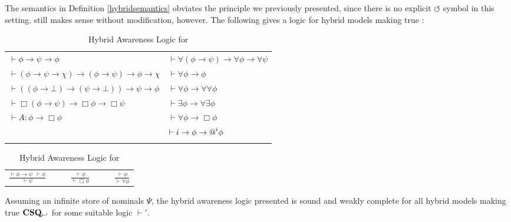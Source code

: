 The semantics in Definition \ref{hybridsemantics} obviates the 
principle we previously presented, since there is no explicit
$\circlearrowleft$ symbol in this setting.  still makes sense
without modification, however.  The following gives a logic for hybrid models
making true :
\begin{table}[h]
\begin{centering}
  \begin{tabular}{ll}
    $\vdash \phi \rightarrow \psi \rightarrow \phi$ & $\vdash \forall (\phi
    \rightarrow \psi) \rightarrow \forall \phi \rightarrow \forall \psi$\\
    $\vdash (\phi \rightarrow \psi \rightarrow \chi) \rightarrow (\phi
    \rightarrow \psi) \rightarrow \phi \rightarrow \chi$ & $\vdash \forall
    \phi \rightarrow \phi$\\
    $\vdash ((\phi \rightarrow \bot) \rightarrow (\psi \rightarrow \bot))
    \rightarrow \psi \rightarrow \phi$ & $\vdash \forall \phi \rightarrow
    \forall \forall \phi$\\
    $\vdash \Box(\phi \rightarrow \psi) \rightarrow \Box \phi \rightarrow \Box
    \psi$ & $\vdash \exists \phi \rightarrow \forall \exists \phi$\\
    $\vdash A : \phi \rightarrow \Box \phi$ & $\vdash \forall \phi \rightarrow
    \Box \phi$\\
    & $\vdash i \rightarrow \phi \rightarrow \text{{\upshape{@}}}^i \phi$\\
    &  
  \end{tabular}
\begin{tabular}{lllll}
      $\displaystyle\frac{\vdash \phi \rightarrow \psi \ \ \vdash \phi}{\vdash
      \psi}$ & \ \  & $\displaystyle \frac{\vdash \phi}{\vdash \Box \phi}$ &
      \ \  & $\displaystyle \frac{\vdash \phi}{\vdash \forall \phi}$
    \end{tabular}
  \caption{\label{logic2}Hybrid Awareness Logic for }
\end{centering}
\end{table}

\begin{theorem}
  \label{completeness2}Assuming an infinite store of nominals $\Psi$, the
  hybrid awareness logic presented is sound and weakly complete for all hybrid
  models making true $\textup{{\bfseries{CSQ}}}_{\vdash'}$ for some
  suitable logic $\vdash'$.
\end{theorem}


